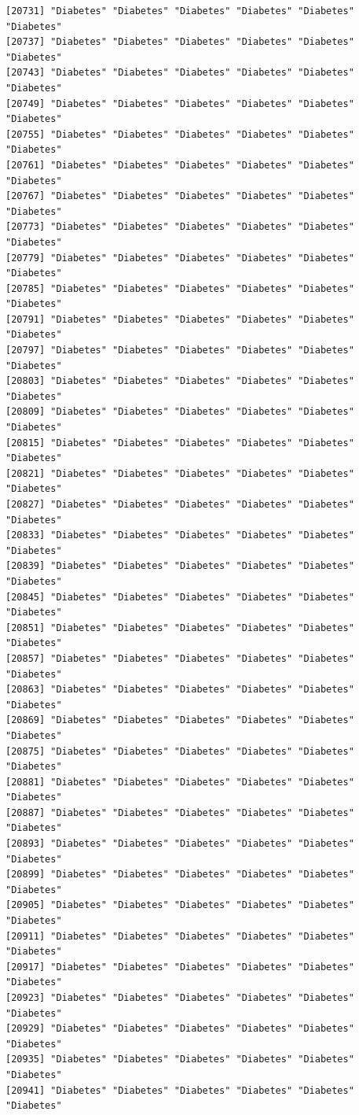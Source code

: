 \documentclass[
  letterpaper,
  DIV=11,
  numbers=noendperiod]{scrartcl}
\begin{document}
\begin{verbatim}
[20731] "Diabetes" "Diabetes" "Diabetes" "Diabetes" "Diabetes" "Diabetes"
[20737] "Diabetes" "Diabetes" "Diabetes" "Diabetes" "Diabetes" "Diabetes"
[20743] "Diabetes" "Diabetes" "Diabetes" "Diabetes" "Diabetes" "Diabetes"
[20749] "Diabetes" "Diabetes" "Diabetes" "Diabetes" "Diabetes" "Diabetes"
[20755] "Diabetes" "Diabetes" "Diabetes" "Diabetes" "Diabetes" "Diabetes"
[20761] "Diabetes" "Diabetes" "Diabetes" "Diabetes" "Diabetes" "Diabetes"
[20767] "Diabetes" "Diabetes" "Diabetes" "Diabetes" "Diabetes" "Diabetes"
[20773] "Diabetes" "Diabetes" "Diabetes" "Diabetes" "Diabetes" "Diabetes"
[20779] "Diabetes" "Diabetes" "Diabetes" "Diabetes" "Diabetes" "Diabetes"
[20785] "Diabetes" "Diabetes" "Diabetes" "Diabetes" "Diabetes" "Diabetes"
[20791] "Diabetes" "Diabetes" "Diabetes" "Diabetes" "Diabetes" "Diabetes"
[20797] "Diabetes" "Diabetes" "Diabetes" "Diabetes" "Diabetes" "Diabetes"
[20803] "Diabetes" "Diabetes" "Diabetes" "Diabetes" "Diabetes" "Diabetes"
[20809] "Diabetes" "Diabetes" "Diabetes" "Diabetes" "Diabetes" "Diabetes"
[20815] "Diabetes" "Diabetes" "Diabetes" "Diabetes" "Diabetes" "Diabetes"
[20821] "Diabetes" "Diabetes" "Diabetes" "Diabetes" "Diabetes" "Diabetes"
[20827] "Diabetes" "Diabetes" "Diabetes" "Diabetes" "Diabetes" "Diabetes"
[20833] "Diabetes" "Diabetes" "Diabetes" "Diabetes" "Diabetes" "Diabetes"
[20839] "Diabetes" "Diabetes" "Diabetes" "Diabetes" "Diabetes" "Diabetes"
[20845] "Diabetes" "Diabetes" "Diabetes" "Diabetes" "Diabetes" "Diabetes"
[20851] "Diabetes" "Diabetes" "Diabetes" "Diabetes" "Diabetes" "Diabetes"
[20857] "Diabetes" "Diabetes" "Diabetes" "Diabetes" "Diabetes" "Diabetes"
[20863] "Diabetes" "Diabetes" "Diabetes" "Diabetes" "Diabetes" "Diabetes"
[20869] "Diabetes" "Diabetes" "Diabetes" "Diabetes" "Diabetes" "Diabetes"
[20875] "Diabetes" "Diabetes" "Diabetes" "Diabetes" "Diabetes" "Diabetes"
[20881] "Diabetes" "Diabetes" "Diabetes" "Diabetes" "Diabetes" "Diabetes"
[20887] "Diabetes" "Diabetes" "Diabetes" "Diabetes" "Diabetes" "Diabetes"
[20893] "Diabetes" "Diabetes" "Diabetes" "Diabetes" "Diabetes" "Diabetes"
[20899] "Diabetes" "Diabetes" "Diabetes" "Diabetes" "Diabetes" "Diabetes"
[20905] "Diabetes" "Diabetes" "Diabetes" "Diabetes" "Diabetes" "Diabetes"
[20911] "Diabetes" "Diabetes" "Diabetes" "Diabetes" "Diabetes" "Diabetes"
[20917] "Diabetes" "Diabetes" "Diabetes" "Diabetes" "Diabetes" "Diabetes"
[20923] "Diabetes" "Diabetes" "Diabetes" "Diabetes" "Diabetes" "Diabetes"
[20929] "Diabetes" "Diabetes" "Diabetes" "Diabetes" "Diabetes" "Diabetes"
[20935] "Diabetes" "Diabetes" "Diabetes" "Diabetes" "Diabetes" "Diabetes"
[20941] "Diabetes" "Diabetes" "Diabetes" "Diabetes" "Diabetes" "Diabetes"

\end{verbatim}
\end{document}
